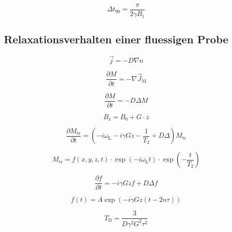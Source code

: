 \begin{equation}
		\label{eq:90kick}
		\Delta t_{90} = \frac{\pi}{2 \gamma B_1}
\end{equation}

\subsection{Relaxationsverhalten einer fluessigen Probe}%
\label{sub:relaxationsverhalten_einer_fluessigen_probe}

\begin{equation}
		\vec{j} = -D \nabla n	
\end{equation}

\begin{equation}
		\frac{\partial M}{\partial t} = - \nabla \vec{J}_\text{M}
\end{equation}


\begin{equation}
		\frac{\partial M}{\partial t} = - D \Delta M
\end{equation}

\begin{equation}
		\label{eq:gradB}
		B_\text{z} = B_0 + G \cdot z
\end{equation}

\begin{equation}
		\frac{\partial M_\text{tr}}{\partial t} = \left(- i \omega_\text{L} - i \gamma
Gz - \frac{1}{T_2} + D \Delta \right) M_\text{tr}
\end{equation}

\begin{equation}
		M_\text{tr} = f(x,y,z,t) \cdot \exp(-i\omega_\text{L}t) \cdot
		\exp\left(-\frac{t}{T_\text{2}}\right)
\end{equation}

\begin{equation}
		\frac{\partial f}{\partial t} = -i \gamma Gzf + D \Delta f
\end{equation}

\begin{equation}
		f(t) = A \exp \left( -i \gamma Gz ( t -2n\tau) \right)
\end{equation}

\begin{equation}
		T_\text{D} = \frac{3}{D \gamma^2 G^2 \tau^2}
\end{equation}

